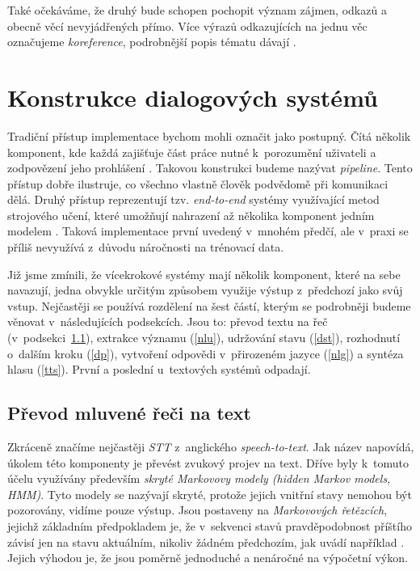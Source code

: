 Také očekáváme, že druhý bude schopen pochopit význam zájmen, odkazů
a obecně věcí nevyjádřených přímo. Více výrazů odkazujících na jednu věc
označujeme \textit{koreference}, podrobnější popis tématu dávají
\citet[kapitola 21]{jurafsky_slp_2020}.


\section{Konstrukce dialogových systémů}

Tradiční přístup implementace bychom mohli označit jako postupný. Čítá několik
komponent, kde každá zajišťuje část práce nutné k~porozumění uživateli a
zodpovězení jeho prohlášení \citep[sekce 4.1]{gao_neural_2019}. Takovou konstrukci budeme nazývat \textit{pipeline}.
Tento přístup dobře ilustruje, co všechno vlastně
člověk podvědomě při komunikaci dělá. Druhý přístup reprezentují tzv. \textit{end-to-end}
systémy využívající metod strojového učení, které umožňují nahrazení až
několika komponent jedním modelem \citep[sekce 4.6]{gao_neural_2019}. Taková implementace první uvedený v~mnohém
předčí, ale v~praxi se příliš nevyužívá z~důvodu náročnosti na trénovací data.

Již jsme zmínili, že vícekrokové systémy mají několik komponent, které na sebe
navazují, jedna obvykle určitým způsobem využije výstup z~předchozí jako svůj
vstup. Nejčastěji se používá rozdělení na šest částí, kterým se podrobněji
budeme věnovat v~následujících podsekcích. Jsou to: převod textu na řeč (v~podsekci~\ref{stt}),
extrakce významu (\ref{nlu}), udržování stavu (\ref{dst}), rozhodnutí o~dalším kroku (\ref{dp}),
vytvoření odpovědi v~přirozeném jazyce (\ref{nlg}) a syntéza hlasu (\ref{tts}). První
a poslední u~textových systémů odpadají.

\subsection{Převod mluvené řeči na text}\label{stt}

Zkráceně značíme nejčastěji \textit{STT} z~anglického \textit{speech-to-text}.
Jak název napovídá, úkolem této komponenty je převést zvukový projev na text.
Dříve byly k~tomuto účelu využívány především \textit{skryté
    Markovovy modely (hidden Markov models, HMM)}. Tyto modely se nazývají skryté,
protože jejich vnitřní stavy nemohou být pozorovány, vidíme pouze výstup.
Jsou postaveny na \textit{Markovových řetězcích}, jejichž základním předpokladem
je, že v~sekvenci stavů pravděpodobnost příštího závisí jen na stavu aktuálním,
nikoliv žádném předchozím, jak uvádí například \citet[strana 4]{brooks_handbook_2011}.
Jejich výhodou je, že jsou poměrně jednoduché a nenáročné na výpočetní výkon.

